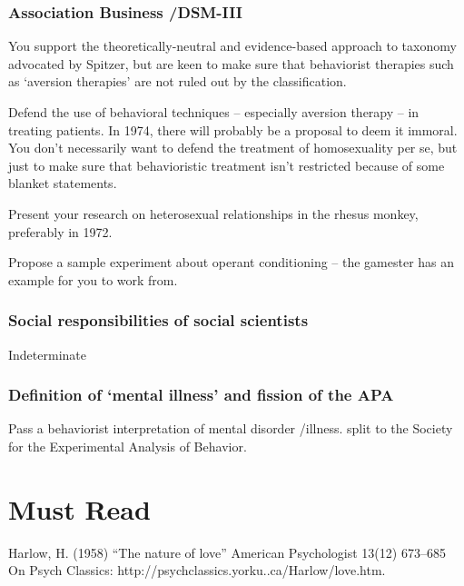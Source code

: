 \begin{refsection}
\subsubsection{Association Business \slash  DSM-III}
\label{associationbusinessdsm-iii}

You support the theoretically-neutral and evidence-based approach to taxonomy advocated by Spitzer, but are keen to make sure that behaviorist therapies such as `aversion therapies' are not ruled out by the classification.

Defend the use of behavioral techniques – especially aversion therapy – in treating patients. In 1974, there will probably be a proposal to deem it immoral. You don't necessarily want to defend the treatment of homosexuality per se, but just to make sure that behavioristic treatment isn't restricted because of some blanket statements.

\begin{writingtask}[Harlow]\label{writingtask:harlow}
Present your research on heterosexual relationships in the rhesus monkey, preferably in 1972.
\end{writingtask}

Propose a sample experiment about operant conditioning -- the gamester has an example for you to work from.

\subsubsection{Social responsibilities of social scientists}
\label{socialresponsibilitiesofsocialscientists}

Indeterminate

\subsubsection{Definition of ‘mental illness’ and fission of the APA}
\label{definitionof‘mentalillness’andfissionoftheapa}

Pass a behaviorist interpretation of mental disorder \slash  illness.
split to the Society for the Experimental Analysis of Behavior.

\section{Must Read}
\label{mustread}

Harlow, H. (1958) “The nature of love” American Psychologist 13(12) 673--685 On Psych Classics: http:\slash \slash psychclassics.yorku..ca\slash Harlow\slash love.htm.


\end{refsection}
